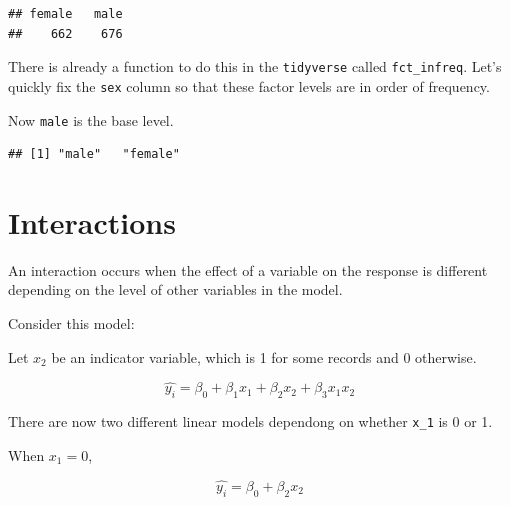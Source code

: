 \documentclass[openany]{book}
\newenvironment{Shaded}{\begin{snugshade}}{\end{snugshade}}
\newcommand{\DataTypeTok}[1]{\textcolor[rgb]{0.13,0.29,0.53}{#1}}
\newcommand{\KeywordTok}[1]{\textcolor[rgb]{0.13,0.29,0.53}{\textbf{#1}}}
\newcommand{\NormalTok}[1]{#1}
\newcommand{\OperatorTok}[1]{\textcolor[rgb]{0.81,0.36,0.00}{\textbf{#1}}}
\newcommand{\StringTok}[1]{\textcolor[rgb]{0.31,0.60,0.02}{#1}}
\begin{document}
\begin{verbatim}
## female   male 
##    662    676
\end{verbatim}

There is already a function to do this in the \texttt{tidyverse} called \texttt{fct\_infreq}. Let's quickly fix the \texttt{sex} column so that these factor levels are in order of frequency.

\begin{Shaded}
\end{Shaded}

Now \texttt{male} is the base level.

\begin{Shaded}
\end{Shaded}

\begin{verbatim}
## [1] "male"   "female"
\end{verbatim}

\hypertarget{interactions}{%
\section{Interactions}\label{interactions}}

An interaction occurs when the effect of a variable on the response is different depending on the level of other variables in the model.

Consider this model:

Let \(x_2\) be an indicator variable, which is 1 for some records and 0 otherwise.

\[\hat{y_i} = \beta_0 + \beta_1 x_1 + \beta_2 x_2 + \beta_3 x_1 x_2\]

There are now two different linear models dependong on whether \texttt{x\_1} is 0 or 1.

When \(x_1 = 0\),

\[\hat{y_i} = \beta_0  + \beta_2 x_2\]
\end{document}
